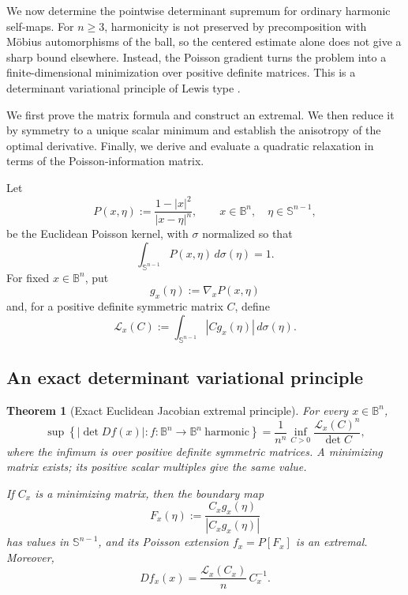 \documentclass[11pt,reqno]{amsart}
\newtheorem{theorem}{Theorem}[section]
\theoremstyle{remark}
\newcommand{\B}{\mathbb B}
\newcommand{\Sph}{\mathbb S}
\begin{document}
We now determine the pointwise determinant supremum for ordinary harmonic
self-maps.  For $n\ge3$, harmonicity is not preserved by precomposition
with M\"obius automorphisms of the ball, so the centered estimate alone
does not give a sharp bound elsewhere.  Instead, the Poisson gradient
turns the problem into a finite-dimensional minimization over positive
definite matrices.  This is a determinant variational principle of
Lewis type \cite{Lewis1979}.

We first prove the matrix formula and construct an extremal.  We then
reduce it by symmetry to a unique scalar minimum and establish the
anisotropy of the optimal derivative.  Finally, we derive and evaluate
a quadratic relaxation in terms of the Poisson-information matrix.

Let
\begin{equation}\label{local:eq:euclidean-Poisson-kernel}
 P(x,\eta)
 :=
 \frac{1-|x|^2}{|x-\eta|^n},
 \qquad
 x\in\B^n,\quad \eta\in\Sph^{n-1},
\end{equation}
be the Euclidean Poisson kernel, with $\sigma$ normalized so that
\[
 \int_{\Sph^{n-1}}P(x,\eta)\,d\sigma(\eta)=1.
\]
For fixed $x\in\B^n$, put
\begin{equation}\label{local:eq:gx-definition}
 g_x(\eta):=\nabla_xP(x,\eta)
\end{equation}
and, for a positive definite symmetric matrix $C$, define
\begin{equation}\label{local:eq:LxC-definition}
 \mathcal L_x(C)
 :=
 \int_{\Sph^{n-1}}|C g_x(\eta)|\,d\sigma(\eta).
\end{equation}

\subsection{An exact determinant variational principle}

\begin{theorem}[Exact Euclidean Jacobian extremal principle]
\label{local:thm:exact-euclidean-jacobian}
For every $x\in\B^n$,
\begin{equation}\label{local:eq:exact-matrix-profile}
 \sup\left\{
 |\det Df(x)|:
 f:\B^n\to\B^n\ \text{harmonic}
 \right\}
 =
 \frac1{n^n}
 \inf_{C>0}
 \frac{\mathcal L_x(C)^n}{\det C},
\end{equation}
where the infimum is over positive definite symmetric matrices.  A minimizing matrix exists; its positive scalar multiples give the same value.

If $C_x$ is a minimizing matrix, then the boundary map
\begin{equation}\label{local:eq:exact-extremal-boundary-general}
 F_x(\eta)
 :=
 \frac{C_xg_x(\eta)}{|C_xg_x(\eta)|}
\end{equation}
has values in $\Sph^{n-1}$, and its Poisson extension $f_x=P[F_x]$ is an
extremal.  Moreover,
\begin{equation}\label{local:eq:exact-extremal-derivative-general}
 Df_x(x)
 =
 \frac{\mathcal L_x(C_x)}{n}\,C_x^{-1}.
\end{equation}
\end{theorem}
\end{document}
